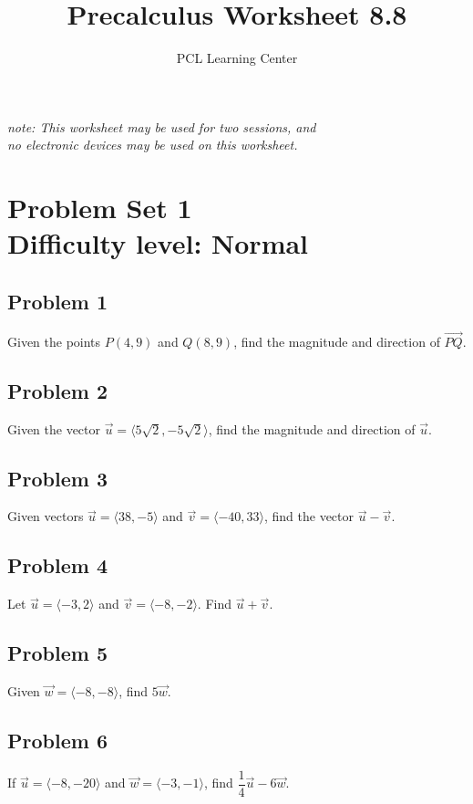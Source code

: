 \documentclass[12pt]{article}
\title{Precalculus Worksheet 8.8}
\author{PCL Learning Center}
\date{}
\begin{document}
\maketitle
\begin{center}
    \textit{note: This worksheet may be used for two sessions, and\\no electronic devices may be used on this worksheet.}
\end{center}

\section*{Problem Set 1\\Difficulty level: Normal}
\subsection*{Problem 1}
Given the points \(P(4,9)\) and \(Q(8,9)\), find the magnitude and direction of \( \overrightarrow{PQ}\).

\subsection*{Problem 2}
Given the vector \(\vec{u}=\langle 5\sqrt{2},-5\sqrt{2} \rangle \), find the magnitude and direction of \(\vec{u}\).

\subsection*{Problem 3}
Given vectors \(\vec{u} = \langle 38, -5 \rangle\) and \(\vec{v} = \langle -40, 33 \rangle\), find the vector \(\vec{u} - \vec{v}\).

\subsection*{Problem 4}
Let \(\vec{u} = \langle -3, 2 \rangle\) and \(\vec{v} = \langle -8, -2 \rangle\). Find \(\vec{u} + \vec{v}\).

\subsection*{Problem 5}
Given \(\vec{w} = \langle -8, -8 \rangle\), find \(5\vec{w}\).

\subsection*{Problem 6}
If \(\vec{u} = \langle -8, -20 \rangle\) and \(\vec{w} = \langle -3, -1 \rangle\), find \(\dfrac{1}{4} \vec{u} - 6\vec{w}\).
\end{document}
